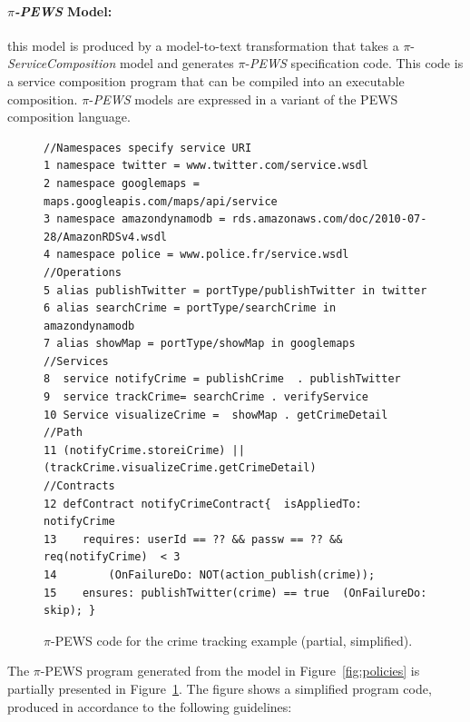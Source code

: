 \documentclass{llncs}
\theoremstyle{plain}
\theoremstyle{plain}
\theoremstyle{plain}
\begin{document}
\paragraph*{$\pi$\textit{-PEWS} Model:}
this model is produced by a model-to-text transformation that takes a $\pi$-\textit{ServiceComposition} model and generates $\pi$-\textit{PEWS} specification code.
This code is a service composition program that can be compiled into an executable composition.
$\pi$-\textit{PEWS} models are expressed in a variant of the PEWS composition language.
\begin{figure}[t]
\begin{small}
\begin{verbatim}
//Namespaces specify service URI
1 namespace twitter = www.twitter.com/service.wsdl
2 namespace googlemaps = maps.googleapis.com/maps/api/service
3 namespace amazondynamodb = rds.amazonaws.com/doc/2010-07-28/AmazonRDSv4.wsdl
4 namespace police = www.police.fr/service.wsdl
//Operations 
5 alias publishTwitter = portType/publishTwitter in twitter
6 alias searchCrime = portType/searchCrime in amazondynamodb 
7 alias showMap = portType/showMap in googlemaps 
//Services
8  service notifyCrime = publishCrime  . publishTwitter 
9  service trackCrime= searchCrime . verifyService
10 Service visualizeCrime =  showMap . getCrimeDetail
//Path
11 (notifyCrime.storeiCrime) || (trackCrime.visualizeCrime.getCrimeDetail)
//Contracts
12 defContract notifyCrimeContract{  isAppliedTo: notifyCrime
13	  requires: userId == ?? && passw == ?? && req(notifyCrime)  < 3
14 	      (OnFailureDo: NOT(action_publish(crime));
15	  ensures: publishTwitter(crime) == true  (OnFailureDo: skip); }
\end{verbatim}
\end{small}
\caption{$\pi$-PEWS code for the crime tracking example (partial, simplified).\label{fig:pewscontract} }
\end{figure}
The $\pi$-PEWS program generated from the model in Figure~\ref{fig:policies} is partially presented in Figure~\ref{fig:pewscontract}. 
The figure shows a simplified program code, produced in accordance to the following guidelines:
\end{document}

